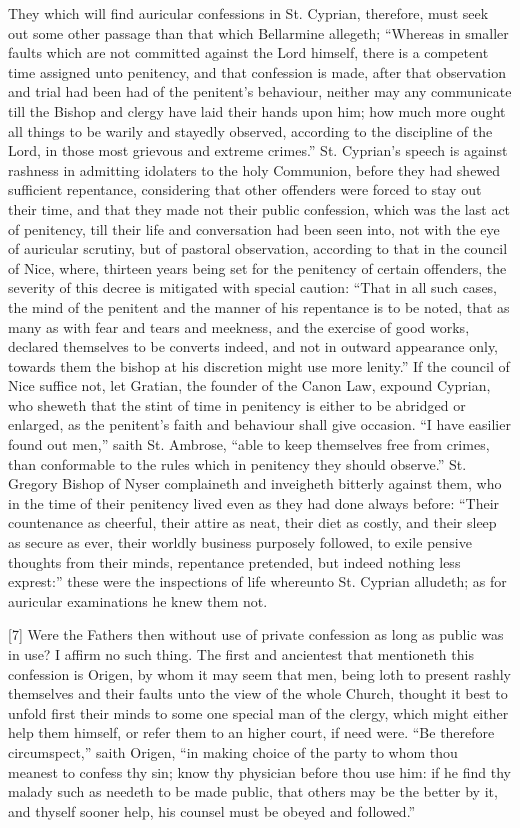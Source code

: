 They which will find auricular confessions in St. Cyprian, therefore, must seek out some other passage than that which Bellarmine allegeth; “Whereas in smaller faults which are not committed against the Lord himself, there is a competent time assigned unto penitency, and that confession is made, after that observation and trial had been had of the penitent’s behaviour, neither may any communicate till the Bishop and clergy have laid their hands upon him; how much more ought all things to be warily and stayedly observed, according to the discipline of the Lord, in those most grievous and extreme crimes.” St. Cyprian’s speech is against rashness in admitting idolaters to the holy Communion, before they had shewed sufficient repentance, considering that other offenders were forced to stay out their time, and that they made not their public confession, which was the last act of penitency, till their life and conversation had been seen into, not with the eye of auricular scrutiny, but of pastoral observation, according to that in the council of Nice, where, thirteen years being set for the penitency of certain offenders, the severity of this decree is mitigated with special caution: “That in all such cases, the mind of the penitent and the manner of his repentance is to be noted, that as many as with fear and tears and meekness, and the exercise of good works, declared themselves to be converts indeed, and not in outward appearance only, towards them the bishop at his discretion might use more lenity.” If the council of Nice suffice not, let Gratian, the founder of the Canon Law, expound Cyprian, who sheweth that the stint of time in penitency is either to be abridged or enlarged, as the penitent’s faith and behaviour shall give occasion. “I have easilier found out men,” saith St. Ambrose, “able to keep themselves free from crimes, than conformable to the rules which in penitency they should observe.” St. Gregory Bishop of Nyser complaineth and inveigheth bitterly against them, who in the time of their penitency lived even as they had done always before: “Their countenance as cheerful, their attire as neat, their diet as costly, and their sleep as secure as ever, their worldly business purposely followed, to exile pensive thoughts from their minds, repentance pretended, but indeed nothing less exprest:” these were the inspections of life whereunto St. Cyprian alludeth; as for auricular examinations he knew them not.

[7] Were the Fathers then without use of private confession as long as public was in use? I affirm no such thing.  The first and ancientest that mentioneth this confession is Origen, by whom it may seem that men, being loth to present rashly themselves and their faults unto the view of the whole Church, thought it best to unfold first their minds to some one special man of the clergy, which might either help them himself, or refer them to an higher court, if need were. “Be therefore circumspect,” saith Origen, “in making choice of the party to whom thou meanest to confess thy sin; know thy physician before thou use him: if he find thy malady such as needeth to be made public, that others may be the better by it, and thyself sooner help, his counsel must be obeyed and followed.”

